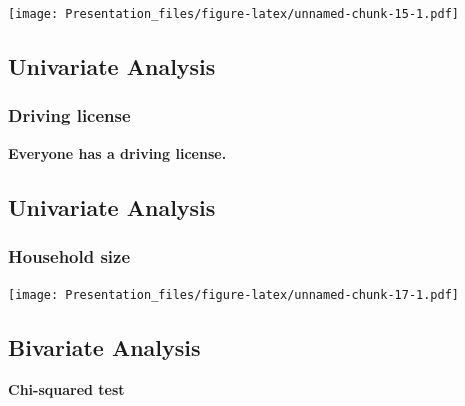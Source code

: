 \documentclass[
]{article}
\begin{document}
\texttt{[image: Presentation\_files/figure-latex/unnamed-chunk-15-1.pdf]}

\hypertarget{univariate-analysis-1}{%
\subsection{Univariate Analysis}\label{univariate-analysis-1}}

\hypertarget{driving-license}{%
\subsubsection{Driving license}\label{driving-license}}

\textbf{Everyone has a driving license.} \newline

\hypertarget{univariate-analysis-2}{%
\subsection{Univariate Analysis}\label{univariate-analysis-2}}

\hypertarget{household-size}{%
\subsubsection{Household size}\label{household-size}}

\texttt{[image: Presentation\_files/figure-latex/unnamed-chunk-17-1.pdf]}

\hypertarget{bivariate-analysis}{%
\subsection{Bivariate Analysis}\label{bivariate-analysis}}

\textbf{Chi-squared test} \newline
\end{document}
